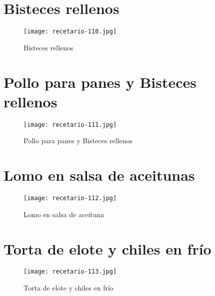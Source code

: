 \documentclass[12pt,letterpaper]{article}
\begin{document}
\newpage

\section{Bisteces rellenos}
  \begin{figure}[H]
    \vspace{2pt}
  \texttt{[image: recetario-110.jpg]}
    \caption{Bisteces rellenos}
    
  \end{figure}


\newpage

\section{Pollo para panes y Bisteces rellenos}
  \begin{figure}[H]
    \vspace{2pt}
  \texttt{[image: recetario-111.jpg]}
    \caption{Pollo para panes y Bisteces rellenos}
    
  \end{figure}

\newpage

\section{Lomo en salsa de aceitunas}
  \begin{figure}[H]
    \vspace{2pt}
  \texttt{[image: recetario-112.jpg]}
    \caption{Lomo en salsa de aceituna}
    
  \end{figure}

\newpage

\section{Torta de elote y chiles en frío}
  \begin{figure}[H]
    \vspace{2pt}
  \texttt{[image: recetario-113.jpg]}
    \caption{Torta de elote y chiles en frío}
    
  \end{figure}

\newpage
\end{document}
